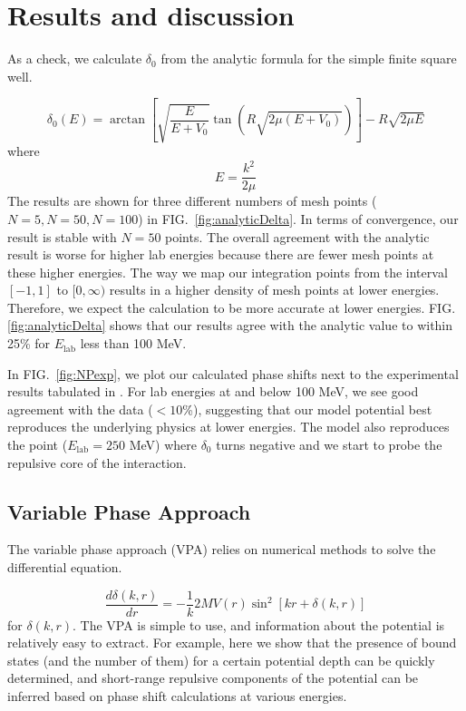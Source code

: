 \documentclass[10pt,showpacs,preprintnumbers,footinbib,amsmath,amssymb,aps,prl,twocolumn,groupedaddress,superscriptaddress,showkeys]{revtex4-1}
\begin{document}
\section{Results and discussion}

As a check, we calculate $\delta _0$ from the analytic formula for the simple finite square
well.

\begin{equation}
	\delta _0(E) = \arctan \left [ \sqrt{\frac{E}{E+V_0}} \tan \left ( R \sqrt{2 \mu (E + V_0)}
 \right ) \right ] - R \sqrt{2 \mu E}
	\label{eq:deltaAnalytic}
\end{equation}
where
\begin{equation*}
	E = \frac{k^2}{2 \mu}
\end{equation*}
The results are shown for three different numbers of mesh points ($N=5,N=50,N=100$) in
FIG.~\ref{fig:analyticDelta}. In terms of convergence, our result is stable with $N=50$ points.
The overall agreement with the analytic result is worse for higher lab energies because there
are fewer mesh points at these higher energies. The way we map our integration points from
the interval $[-1,1]$ to $[0,\infty)$ results in a higher density of mesh points at lower energies.
Therefore, we expect the calculation to be more accurate at lower energies. FIG.~
\ref{fig:analyticDelta}
shows that our results agree with the analytic value to within 25\% for $E_{\mathrm{lab}}$ less
than 100 MeV.

In FIG.~\ref{fig:NPexp}, we plot our calculated phase shifts next to the experimental results
tabulated in \citep{Nijmegen}. For lab energies at and below 100 MeV, we see good agreement
with the data ($< 10$\%), suggesting that our model potential best reproduces the underlying
physics at lower energies. The model also reproduces the point ($E_{\mathrm{lab}} = 250$ MeV)
where $\delta_0$ turns negative and we start to probe the repulsive core of the interaction.


\subsection{Variable Phase Approach}
The variable phase approach (VPA) relies on numerical methods to solve the differential equation.

\[
\frac{d\delta(k,r)}{dr} = -\frac{1}{k} 2M V(r) \sin^2[kr + \delta(k,r)]
\]
for $\delta(k,r)$. The VPA is simple to use,
and information about the potential is relatively easy to extract. For example, here we show
that the presence of bound states (and the number of them) for a certain potential depth can
be quickly determined, and short-range repulsive components of the potential can
be inferred based on phase shift calculations at various energies.
\end{document}
